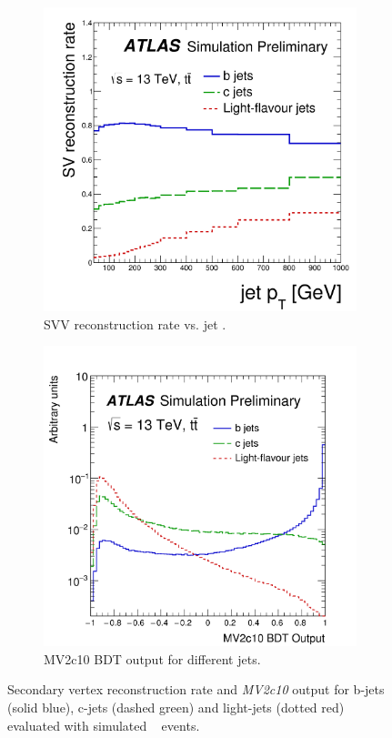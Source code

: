 \begin{figure}[htbp!]
\centering
\captionsetup{justification=centering}
    \begin{subfigure}[b]{0.4\textwidth}
        \includegraphics[width=\textwidth]{figures/object/b_sv}
        \caption{SVV reconstruction rate vs. jet \pt.}
        \label{fig:obj_b_sv}
    \end{subfigure}
    \quad
    \begin{subfigure}[b]{0.43\textwidth}
        \includegraphics[width=\textwidth]{figures/object/b_mv2}
        \caption{MV2c10 BDT output for different jets.}
        \label{fig:obj_b_mv2}
    \end{subfigure}
\caption{Secondary vertex reconstruction rate and \emph{MV2c10} output for b-jets (solid blue), c-jets (dashed green) and light-jets (dotted red) evaluated with simulated \ttbar~ events.}
\label{fig:obj_btag}
\end{figure}


